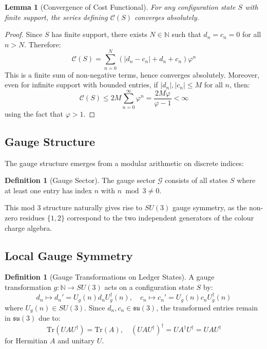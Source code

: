 \documentclass[11pt]{article}
\numberwithin{equation}{section}
\newtheorem{lemma}[theorem]{Lemma}
\theoremstyle{definition}
\newtheorem{definition}[theorem]{Definition}
\theoremstyle{remark}
\begin{document}
\begin{lemma}[Convergence of Cost Functional]
For any configuration state $S$ with finite support, the series defining $\mathcal{C}(S)$ converges absolutely.
\end{lemma}

\begin{proof}
Since $S$ has finite support, there exists $N \in \mathbb{N}$ such that $d_n = c_n = 0$ for all $n > N$. Therefore:
\begin{equation}
\mathcal{C}(S) = \sum_{n=0}^{N} \left(|d_n - c_n| + d_n + c_n\right) \varphi^n
\end{equation}
This is a finite sum of non-negative terms, hence converges absolutely. Moreover, even for infinite support with bounded entries, if $|d_n|, |c_n| \leq M$ for all $n$, then:
\begin{equation}
\mathcal{C}(S) \leq 2M \sum_{n=0}^{\infty} \varphi^n = \frac{2M\varphi}{\varphi - 1} < \infty
\end{equation}
using the fact that $\varphi > 1$.
\end{proof}

\subsection{Gauge Structure}

The gauge structure emerges from a modular arithmetic on discrete indices:

\begin{definition}[Gauge Sector]
The gauge sector $\mathcal{G}$ consists of all states $S$ where at least one entry has index $n$ with $n \bmod 3 \neq 0$.
\end{definition}

This mod 3 structure naturally gives rise to $SU(3)$ gauge symmetry, as the non-zero residues $\{1, 2\}$ correspond to the two independent generators of the colour charge algebra.

\subsection{Local Gauge Symmetry}

\begin{definition}[Gauge Transformations on Ledger States]
A gauge transformation $g: \mathbb{N} \to SU(3)$ acts on a configuration state $S$ by:
\begin{equation}
d_n \mapsto d_n' = U_g(n) d_n U_g^\dagger(n), \quad c_n \mapsto c_n' = U_g(n) c_n U_g^\dagger(n)
\end{equation}
where $U_g(n) \in SU(3)$. Since $d_n, c_n \in \mathfrak{su}(3)$, the transformed entries remain in $\mathfrak{su}(3)$ due to:
\begin{equation}
\text{Tr}(U A U^\dagger) = \text{Tr}(A), \quad (U A U^\dagger)^\dagger = U A^\dagger U^\dagger = U A U^\dagger
\end{equation}
for Hermitian $A$ and unitary $U$.
\end{definition}
\end{document}
